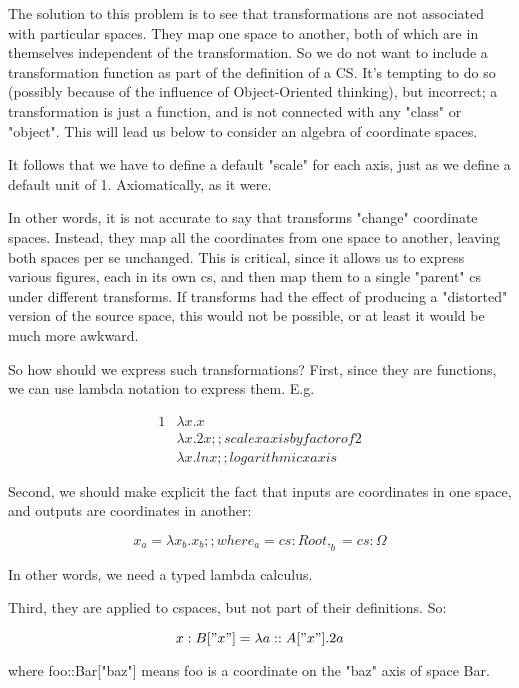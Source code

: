 \documentclass{tufte-handout}
\numberwithin{equation}{subsection}
\begin{document}
The solution to this problem is to see that transformations are not
associated with particular spaces.  They map one space to another,
both of which are in themselves independent of the transformation.  So
we do not want to include a transformation function as part of the
definition of a CS.  It's tempting to do so (possibly because of the
influence of Object-Oriented thinking), but incorrect; a
transformation is just a function, and is not connected with any
"class" or "object".  This will lead us below to consider an algebra
of coordinate spaces.

It follows that we have to define a default "scale" for each axis,
just as we define a default unit of 1.  Axiomatically, as it were.

In other words, it is not accurate to say that transforms "change"
coordinate spaces.  Instead, they map all the coordinates from one
space to another, leaving both spaces per se unchanged.  This is
critical, since it allows us to express various figures, each in its
own cs, and then map them to a single "parent" cs under different
transforms.  If transforms had the effect of producing a "distorted"
version of the source space, this would not be possible, or at least
it would be much more awkward.

So how should we express such transformations?  First, since they are
functions, we can use lambda notation to express them.  E.g.

{
  \begin{alignat}{1}
	   & \lambda x.x \\
	   & \lambda x.2x   ;; scale x axis by factor of 2 \\
	   & \lambda x.ln x ;; logarithmic x axis
  \end{alignat}
}

Second, we should make explicit the fact that inputs are coordinates
in one space, and outputs are coordinates in another:

$$x_a = \lambda x_b.x_b  ;; where _a = cs:Root, _b = cs:\Omega$$

In other words, we need a typed lambda calculus.

Third, they are applied to cspaces, but not part of their definitions.
So:

\begin{equation}
  x:B["x"] = \lambda a::A["x"].2a
\end{equation}


where foo::Bar["baz"] means foo is a coordinate on the "baz" axis of space Bar.
\end{document}
